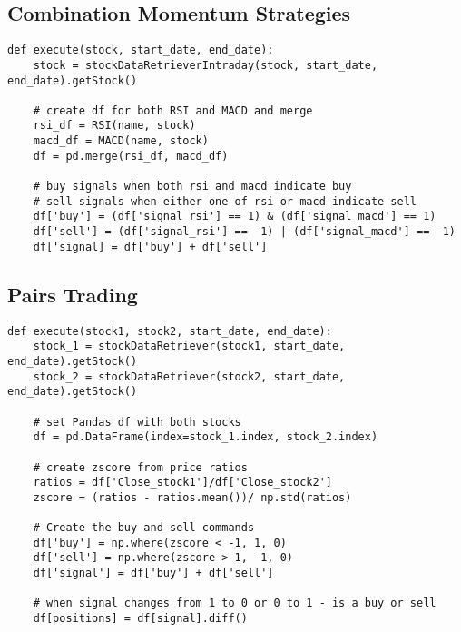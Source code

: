 \documentclass[../thesis.tex]{subfiles}
\begin{document}
\subsection{Combination Momentum Strategies }

\begin{verbatim}
def execute(stock, start_date, end_date):
    stock = stockDataRetrieverIntraday(stock, start_date, end_date).getStock()
	
    # create df for both RSI and MACD and merge
    rsi_df = RSI(name, stock)
    macd_df = MACD(name, stock)
    df = pd.merge(rsi_df, macd_df)
    
    # buy signals when both rsi and macd indicate buy
    # sell signals when either one of rsi or macd indicate sell
    df['buy'] = (df['signal_rsi'] == 1) & (df['signal_macd'] == 1)
    df['sell'] = (df['signal_rsi'] == -1) | (df['signal_macd'] == -1)
    df['signal] = df['buy'] + df['sell']

\end{verbatim}

\subsection{Pairs Trading}

\begin{verbatim}
def execute(stock1, stock2, start_date, end_date):
    stock_1 = stockDataRetriever(stock1, start_date, end_date).getStock()
    stock_2 = stockDataRetriever(stock2, start_date, end_date).getStock()

    # set Pandas df with both stocks
    df = pd.DataFrame(index=stock_1.index, stock_2.index)

    # create zscore from price ratios
    ratios = df['Close_stock1']/df['Close_stock2']
    zscore = (ratios - ratios.mean())/ np.std(ratios)

    # Create the buy and sell commands
    df['buy'] = np.where(zscore < -1, 1, 0)
    df['sell'] = np.where(zscore > 1, -1, 0)
    df['signal'] = df['buy'] + df['sell']

    # when signal changes from 1 to 0 or 0 to 1 - is a buy or sell
    df[positions] = df[signal].diff()

\end{verbatim}
\end{document}
